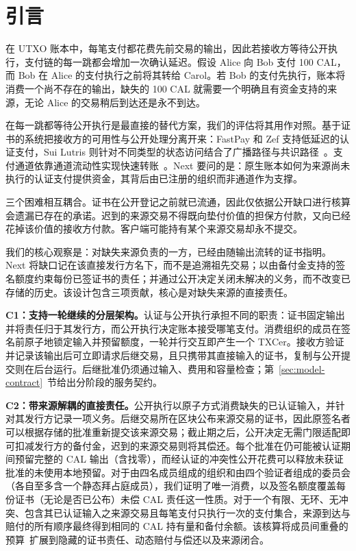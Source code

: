 \section{引言}
\label{sec:introduction}

在 UTXO 账本中，每笔支付都花费先前交易的输出，因此若接收方等待公开执行，支付链的每一跳都会增加一次确认延迟。假设 Alice 向 Bob 支付 100 CAL，而 Bob 在 Alice 的支付执行之前将其转给 Carol。若 Bob 的支付先执行，账本将消费一个尚不存在的输出，缺失的 100 CAL 就需要一个明确且有资金支持的来源，无论 Alice 的交易稍后到达还是永不到达。

在每一跳都等待公开执行是最直接的替代方案，我们的评估将其用作对照。基于证书的系统把接收方的可用性与公开处理分离开来：FastPay 和 Zef 支持低延迟的认证支付，Sui Lutris 则针对不同类型的状态访问结合了广播路径与共识路径~\cite{fastpay,zef,lutris}。支付通道依靠通道流动性实现快速转账~\cite{blitz,donner}。Next 要问的是：原生账本如何为来源尚未执行的认证支付提供资金，其背后由已注册的组织而非通道作为支撑。

三个困难相互耦合。证书在公开登记之前就已流通，因此仅依据公开缺口进行核算会遗漏已存在的承诺。迟到的来源交易不得既向垫付价值的担保方付款，又向已经花掉该价值的接收方付款。客户端可能持有某个来源交易却永不提交。

我们的核心观察是：对缺失来源负责的一方，已经由随输出流转的证书指明。Next 将缺口记在该直接发行方名下，而不是追溯祖先交易；以由备付金支持的签名额度约束每份已签证书的责任；并通过公开决定关闭未解决的义务，而不改变已存储的历史。该设计包含三项贡献，核心是对缺失来源的直接责任。

\noindent\textbf{C1：支持一轮继续的分层架构。}认证与公开执行承担不同的职责：证书固定输出并将责任归于其发行方，而公开执行决定账本接受哪笔支付。消费组织的成员在签名前原子地锁定输入并预留额度，一轮并行交互即产生一个 TXCer。接收方验证并记录该输出后可立即请求后继交易，且只携带其直接输入的证书，复制与公开提交则在后台运行。后继批准仍须通过输入、费用和容量检查；第~\ref{sec:model-contract}~节给出分阶段的服务契约。

\noindent\textbf{C2：带来源解耦的直接责任。}公开执行以原子方式消费缺失的已认证输入，并针对其发行方记录一项义务。后继交易所在区块公布来源交易的证书，因此原签名者可以根据存储的批准重新提交该来源交易；截止期之后，公开决定无需门限适配即可扣减发行方的备付金，迟到的来源交易则将其偿还。每个批准在仍可能被认证期间预留完整的 CAL 输出（含找零），而经认证的冲突性公开花费可以释放未获证批准的未使用本地预留。对于由四名成员组成的组织和由四个验证者组成的委员会（各自至多含一个静态拜占庭成员），我们证明了唯一消费，以及签名额度覆盖每份证书（无论是否已公布）未偿 CAL 责任这一性质。对于一个有限、无环、无冲突、包含其已认证输入之来源交易且每笔支付只执行一次的支付集合，来源到达与赔付的所有顺序最终得到相同的 CAL 持有量和备付余额。该核算将成员间重叠的预算~\cite{stingray}扩展到隐藏的证书责任、动态赔付与偿还以及来源闭合。

